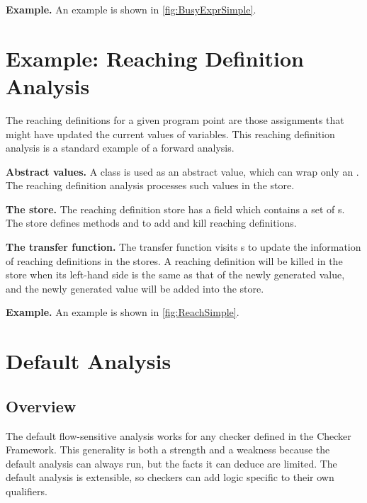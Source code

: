 \textbf{Example.} An example is shown in \autoref{fig:BusyExprSimple}.


\section{Example: Reaching Definition Analysis}

The reaching definitions for a given program point are those assignments that
might have updated the current values of variables.
This reaching definition analysis is a standard example of a forward analysis.

\textbf{Abstract values.} A class  is used as an
abstract value, which can wrap only an . The reaching definition analysis
processes such values in the store.

\textbf{The store.} The reaching definition store  has a field
 which contains a set of s. The store defines methods
 and  to add
and kill reaching definitions.

\textbf{The transfer function.} The transfer function visits s to
update the information of reaching definitions in the stores. A reaching definition will
be killed in the store when its left-hand side is the same as that of the newly generated value, and the newly
generated value will be added into the store.

\textbf{Example.} An example is shown in \autoref{fig:ReachSimple}.



\section{Default Analysis}


\subsection{Overview}

The default flow-sensitive analysis 
works for any checker defined in the
Checker Framework.  This generality is both a strength and a weakness
because the default analysis can always run, but the facts it can
deduce are limited.  The default analysis is extensible, so checkers
can add logic specific to their own qualifiers.

